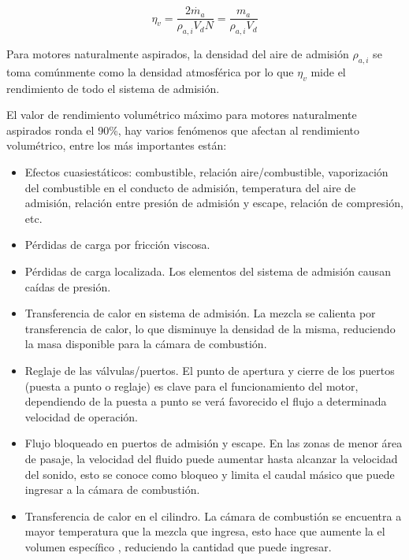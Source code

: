 \begin{equation}\label{eq:eta_v}
    \eta_v = \frac{2\dot{m_a}}{\rho_{a,i}V_d N} = \frac{m_a}{\rho_{a,i}V_d}
\end{equation}

Para motores naturalmente aspirados, la densidad del aire de admisión
$\rho_{a,i}$ se toma comúnmente como la densidad atmosférica por lo que
$\eta_v$ mide el rendimiento de todo el sistema de admisión.

El valor de rendimiento volumétrico máximo para motores naturalmente aspirados
ronda el 90\%, hay varios fenómenos que afectan al rendimiento volumétrico,
entre los más importantes están:

\begin{itemize}
    \item Efectos cuasiestáticos: combustible, relación aire/combustible,
        vaporización del combustible en el conducto de admisión, temperatura
        del aire de admisión, relación entre presión de admisión y escape,
        relación de compresión, etc.
    \item Pérdidas de carga por fricción viscosa. 
    \item Pérdidas de carga localizada.
        Los elementos del sistema de admisión causan caídas de presión.
    \item Transferencia de calor en sistema de admisión.
        La mezcla se calienta por transferencia de calor, lo que disminuye la
        densidad de la misma, reduciendo la masa disponible para la cámara de
        combustión.
    \item Reglaje de las válvulas/puertos.
        El punto de apertura y cierre de los puertos (puesta a punto o reglaje)
        es clave para el funcionamiento del motor, dependiendo de la puesta a
        punto se verá favorecido el flujo a determinada velocidad de operación.
    \item Flujo bloqueado en puertos de admisión y escape.
        En las zonas de menor área de pasaje, la velocidad del fluido puede
        aumentar hasta alcanzar la velocidad del sonido, esto se conoce como
        bloqueo y limita el caudal másico que puede ingresar a la cámara de
        combustión. 
    \item Transferencia de calor en el cilindro.
        La cámara de combustión se encuentra a mayor temperatura que la mezcla
        que ingresa, esto hace que aumente la el volumen específico ,
        reduciendo la cantidad que puede ingresar.

\end{itemize}
